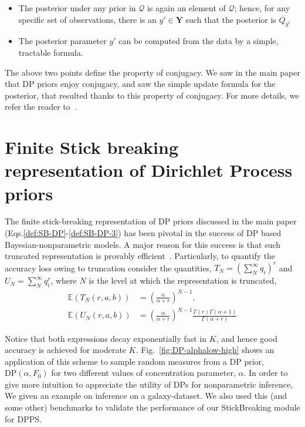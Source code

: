 \documentclass[10pt]{article}
\def\E{\mathbb{E}}
\begin{document}
\begin{itemize}
    \item The posterior under any prior in $\mathcal{Q}$ is again an element of $\mathcal{Q}$; hence, for any specific set of observations, there is an $y' \in \mathbf{Y}$ such that the posterior is $Q_{y'}$
    \item The posterior parameter $y'$ can be computed from the data by a simple, tractable formula.
\end{itemize}

The above two points define the property of conjugacy. We saw in the main paper that DP priors enjoy conjugacy, and saw the simple update formula for the posterior, that resulted thanks to this property of conjugacy. For more details, we refer the reader to~\citep{orbanz2009construction}. 


\section{Finite Stick breaking representation of Dirichlet Process priors}
\label{sec:stick-breaking-finite}

The finite stick-breaking representation of DP priors discussed in the main paper (Eqs.\ref{def:SB-DP}-\ref{def:SB-DP-3}) has been pivotal in the success of DP based Bayesian-nonparametric models. A major reason for this success is that such truncated representation is provably efficient~\citep{ishwaran2001gibbs}. Particularly, to quantify the accuracy loss owing to truncation consider the quantities, $T_{N} = (\sum_{N}^{\infty} q_{i})^{r}$ and $U_{N} = \sum_{N}^{\infty} q_{i}^{r}$, where $N$ is the level at which the representation is truncated,
\begin{align}
\E(T_{N}(r,a,b)) &= \left(\frac{\alpha}{\alpha+r}\right)^{N-1} ,\\
\E(U_{N}(r,a,b)) &= \left(\frac{\alpha}{\alpha+r}\right)^{N-1} \frac{\Gamma(r)\Gamma(\alpha + 1)}{\Gamma (\alpha + r)} 
\end{align}

Notice that both expressions decay exponentially fast in $K$, and hence good accuracy is achieved for moderate $K$. Fig.~\ref{fig:DP-alphalow-high} shows an application of this scheme to sample random measures from a DP prior, $\mathrm{DP}(\alpha, F_{0})$  for two different values of concentration parameter, $\alpha$. In order to give more intuition to appreciate the utility of DPs for nonparametric inference,  We given an example on inference on a galaxy-dataset. We also used this (and some other) benchmarks to validate the performance of our StickBreaking module for DPPS. 
\end{document}
